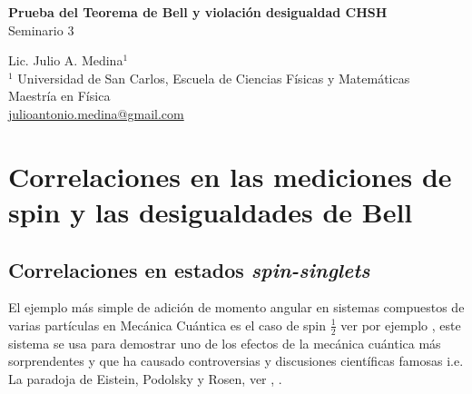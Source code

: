 \documentclass[a4paper]{article}
\begin{document}

\Large
 \begin{center}
\textbf{Prueba del Teorema de Bell y violación desigualdad CHSH}\\
Seminario 3  

\hspace{10pt}

\large
Lic. Julio A. Medina$^1$ \\

\hspace{10pt}
\small  
$^1$ Universidad de San Carlos, Escuela de Ciencias Físicas y Matemáticas\\
Maestría en Física\\
\href{mailto:julioantonio.medina@gmail.com}{julioantonio.medina@gmail.com}\\

\end{center}

\hspace{10pt}


\normalsize

\begin{abstract}
El Teorema de Bell y las desigualdades asociadas fueron de gran importancia para establecer la validez de las correlaciones que se dan en la mecánica cuántica, con esto se logró esclarecer la paradoja de Einstein-Podolsky-Rosen sobre teorías de variables ocultas y la no-localidad de la teoría cuántica. Para establecer la validez experimental de los resultados de Bell, Clauser, Horne, Shimony y Holt derivaron las desigualdades CHSH que al igual que las desigualdades de Bell poné restricciones en las ocurrencias estadísticas de una . Estas confirmaciones experimentales pueden realizarse por medio de un circuito cuántico, en este reporte se expande en todo el desarrollo teórico y se implementan los circuitos por medio de Qiskit para comprobar que la naturaleza viola las desigualdades CHSH y por lo tanto las desigualdades de Bell, lo que significa que las teorías de variables ocultas locales son incompatibles con la mecánica cuántica.
\end{abstract}

\section{Correlaciones en las mediciones de spin y las desigualdades de Bell}
\subsection{Correlaciones en estados \textit{spin-singlets}}
El ejemplo más simple de adición de momento angular en sistemas compuestos de varias partículas en Mecánica Cuántica es el caso de spin $\frac{1}{2}$ ver por ejemplo \cite{Sakurai}, este sistema se usa para demostrar uno de los efectos de la mecánica cuántica más sorprendentes y que ha causado controversias y discusiones científicas famosas i.e. La paradoja de Eistein, Podolsky y Rosen, ver \cite{Einstein}, \cite{Bell}.\\
\end{document}
